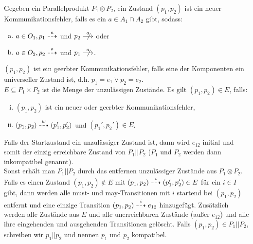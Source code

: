 \begin{Def}[Parallelkomposition]
  Gegeben ein Parallelprodukt $P_1\otimes P_2$, ein Zustand $(p_1,p_2)$ ist ein
  neuer Kommunikationsfehler, falls es ein $a\in A_1\cap A_2$ gibt, sodass:
  \begin{enumerate}[(a)]
    \item $a\in O_1, p_1\may[a]$ und $p_2\nmust[a]$ oder
    \item $a\in O_2, p_2\may[a]$ und $p_1\nmust[a]$.
  \end{enumerate}
  $(p_1,p_2)$ ist ein geerbter Kommunikationsfehler, falls eine der Komponenten
  ein universeller Zustand ist, d.h. $p_1=e_1\lor p_2=e_2$.\\
  $E\subseteq P_1\times P_2$ ist die Menge der unzulässigen Zustände. Es gilt
  $(p_1,p_2)\in E$, falls:
  \begin{enumerate}[(i)]
    \item $(p_1,p_2)$ ist ein neuer oder geerbter Kommunikationsfehler,
    \item $(p_1,p_2)\may[w] (p_1',p_2')$ und $(p_1',p_2')\in E$.
  \end{enumerate}
  Falls der Startzustand ein unzulässiger Zustand ist, dann wird $e_{12}$
  initial und somit der einzig erreichbare Zustand von $P_1||P_2$ ($P_1$ und
  $P_2$ werden dann inkompatibel genannt).\\
  Sonst erhält man $P_1||P_2$ durch das entfernen unzulässiger Zustände aus
  $P_1\otimes P_2$. Falls es einen Zustand $(p_1,p_2)\notin E$ mit
  $(p_1,p_2)\may[i](p_1',p_2')\in E$ für ein $i\in I$ gibt, dann werden alle
  must- und may-Transitionen mit $i$ startend bei $(p_1,p_2)$ entfernt und eine
  einzige Transition $(p_1,p_2)\may[i]e_{12}$ hinzugefügt. Zusätzlich werden
  alle Zustände aus $E$ und alle unerreichbaren Zustände (außer $e_{12}$) und
  alle ihre eingehenden und ausgehenden Transitionen gelöscht. Falls
  $(p_1,p_2)\in P_1||P_2$, schreiben wir $p_1||p_2$ und nennen $p_1$ und $p_2$
  kompatibel.
\end{Def}


